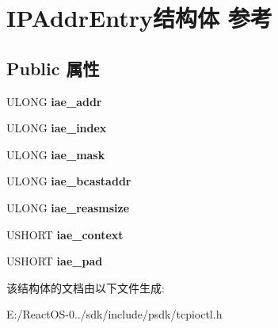 \hypertarget{struct_i_p_addr_entry}{}\section{I\+P\+Addr\+Entry结构体 参考}
\label{struct_i_p_addr_entry}
\subsection*{Public 属性}
\begin{DoxyCompactItemize}
\item 
\mbox{\label{struct_i_p_addr_entry_aa51b8a06a51a5911ee5cea70123ad5f0}} 
U\+L\+O\+NG {\bfseries iae\+\_\+addr}
\item 
\mbox{\label{struct_i_p_addr_entry_a67ae4766c7697f51da4a4ce8284dabdf}} 
U\+L\+O\+NG {\bfseries iae\+\_\+index}
\item 
\mbox{\label{struct_i_p_addr_entry_a3a21a0808525ae0704cd746a4a0168e8}} 
U\+L\+O\+NG {\bfseries iae\+\_\+mask}
\item 
\mbox{\label{struct_i_p_addr_entry_acaab1cd94371db8966cabce0b51bd1cf}} 
U\+L\+O\+NG {\bfseries iae\+\_\+bcastaddr}
\item 
\mbox{\label{struct_i_p_addr_entry_ae615c3db7d5317505054cc2c8f42a673}} 
U\+L\+O\+NG {\bfseries iae\+\_\+reasmsize}
\item 
\mbox{\label{struct_i_p_addr_entry_ace5f373819ac8e25c9b74e40fa36ac7a}} 
U\+S\+H\+O\+RT {\bfseries iae\+\_\+context}
\item 
\mbox{\label{struct_i_p_addr_entry_aeb77379cde2c2d34a11532a2ae4db8df}} 
U\+S\+H\+O\+RT {\bfseries iae\+\_\+pad}
\end{DoxyCompactItemize}


该结构体的文档由以下文件生成\+:\begin{DoxyCompactItemize}
\item 
E\+:/\+React\+O\+S-\/0../sdk/include/psdk/tcpioctl.\+h\end{DoxyCompactItemize}
